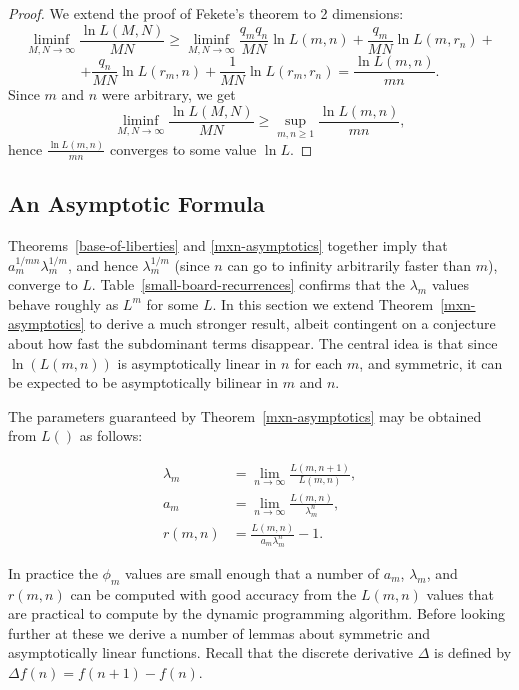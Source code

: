 \documentclass{article}
\begin{document}
\begin{proof}
We extend the proof of Fekete's theorem to 2 dimensions:
\[ \liminf_{M,N\rightarrow \infty} \frac{\ln L(M,N)}{M N} \geq
\liminf_{M,N\rightarrow \infty} \frac{q_m q_n}{M N} \ln L(m,n)
+ \frac{q_m}{M N} \ln L(m,r_n) + \]
\[ + \frac{q_n}{M N} \ln L(r_m,n)
+ \frac{1}{M N}\ln L(r_m,r_n) = \frac{\ln L(m,n)}{m n}. \]
Since $m$ and $n$ were arbitrary, we get
\[ \liminf_{M,N\rightarrow \infty} \frac{\ln L(M,N)}{M N} \geq
\sup_{m,n \geq 1} \frac{\ln L(m,n)}{m n}, \]
hence $\frac{\ln L(m,n)}{m n}$ converges to some value $\ln L$.
\end{proof}

\subsection{An Asymptotic Formula}

Theorems~\ref{base-of-liberties} and \ref{mxn-asymptotics}
together imply that $a_m^{1/mn} \lambda_m^{1/m}$,
and hence $\lambda_m^{1/m}$
(since $n$ can go to infinity arbitrarily faster than $m$),
converge to $L$.
Table~\ref{small-board-recurrences} confirms that the $\lambda_m$
values behave roughly as $L^m$ for some $L$.
In this section we extend Theorem~\ref{mxn-asymptotics}
to derive a much stronger result, albeit contingent on a
conjecture about how fast the subdominant terms disappear. The central
idea is that since $\ln(L(m,n))$ is asymptotically linear in $n$ for
each $m$, and symmetric, it can be expected to be asymptotically
bilinear in $m$ and $n$.

The parameters guaranteed by Theorem~\ref{mxn-asymptotics}
may be obtained from $L()$ as follows:

\begin{coro}
  \[
  \begin{split}
    \lambda_m &= \lim_{n \rightarrow \infty} \frac{L(m,n+1)}{L(m,n)}, \\
    a_m &= \lim_{n \rightarrow \infty} \frac{L(m,n)}{\lambda_m^n}, \\
    r(m,n) &= \frac{L(m,n)}{a_m^{} \lambda_m^n} - 1.
  \end{split}
  \]
\end{coro}

In practice the $\phi_m$ values are small enough that a number of
$a_m$, $\lambda_m$, and $r(m,n)$ can be computed with good accuracy
from the $L(m,n)$ values that are practical to compute by the dynamic
programming algorithm. Before looking further at these we derive a
number of lemmas about symmetric and asymptotically linear functions.
Recall that the discrete derivative $\Delta$ is defined by
$\Delta f(n) = f(n+1)-f(n)$.
\end{document}
